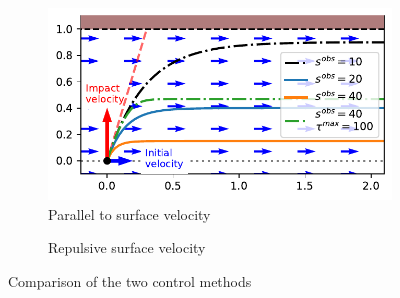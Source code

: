 \documentclass[conference]{IEEEtran}
\begin{document}
\begin{figure}
\centering
\begin{subfigure}{0.99\columnwidth}
  \centerline{\includegraphics[width=\textwidth]{figures/parallel_avoidance_obstacle}}
  \caption{Parallel to surface velocity}
  \label{fig:disturbance_with_parallel_velocity}
\end{subfigure}
\begin{subfigure}{0.5\columnwidth}
  \caption{Repulsive surface velocity}
  \label{fig:disturbance_with_repulsive_velocity}
\end{subfigure}
\caption{Comparison of the two control methods}
\label{fig:disturbance_rejection_schematics}
\end{figure}




 



\renewcommand*{\bibfont}{\footnotesize}
\printbibliography
\end{document}
